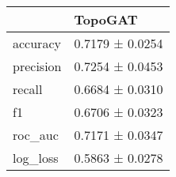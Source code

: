 \begin{tabular}{ll}
\toprule
 & TopoGAT \\
\midrule
accuracy & 0.7179 ± 0.0254 \\
precision & 0.7254 ± 0.0453 \\
recall & 0.6684 ± 0.0310 \\
f1 & 0.6706 ± 0.0323 \\
roc_auc & 0.7171 ± 0.0347 \\
log_loss & 0.5863 ± 0.0278 \\
\bottomrule
\end{tabular}

